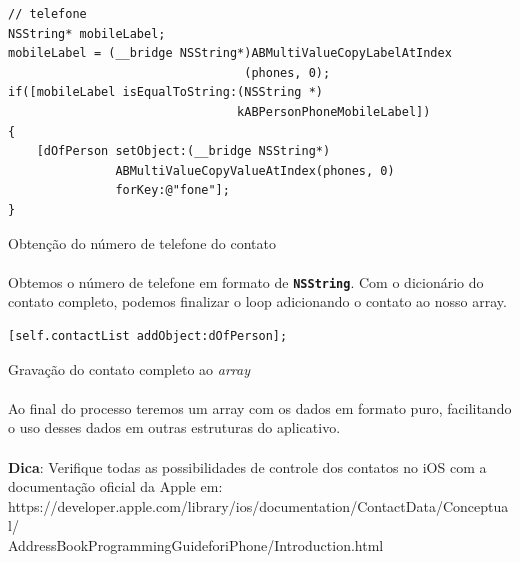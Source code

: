 \documentclass[a4paper,12pt,brazil,doubleside]{book}
\begin{document}
\begin{singlespace}
\begin{listing}[H]
\begin{verbatim}
// telefone
NSString* mobileLabel;
mobileLabel = (__bridge NSString*)ABMultiValueCopyLabelAtIndex
                                 (phones, 0);
if([mobileLabel isEqualToString:(NSString *)
                                kABPersonPhoneMobileLabel])
{
    [dOfPerson setObject:(__bridge NSString*)
               ABMultiValueCopyValueAtIndex(phones, 0)
               forKey:@"fone"];
}
\end{verbatim}
\caption{Obtenção do número de telefone do contato}
\end{listing}

\paragraph{}Obtemos o número de telefone em formato de \texttt{\textbf{NSString}}. Com o dicionário do contato completo, podemos finalizar o loop adicionando o contato ao nosso array.

\begin{listing}[H]
\begin{verbatim}
[self.contactList addObject:dOfPerson];
\end{verbatim}
\caption{Gravação do contato completo ao \emph{array}}
\end{listing}

\paragraph{}Ao final do processo teremos um array com os dados em formato puro, facilitando o uso desses dados em outras estruturas do aplicativo.

\bigskip

\begin{framed}
\paragraph{}\textbf{Dica}: Verifique todas as possibilidades de controle dos contatos no iOS com a documentação oficial da Apple em:\\ https://developer.apple.com/library/ios/documentation/ContactData/Conceptual/\\AddressBookProgrammingGuideforiPhone/Introduction.html
\end{framed}


\end{singlespace}
\end{document}
